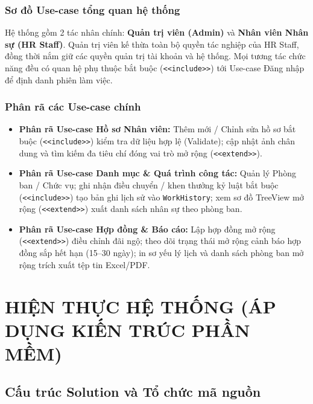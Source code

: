 \documentclass[12pt,a4paper]{report}
\begin{document}
\subsection{Sơ đồ Use-case tổng quan hệ thống}
Hệ thống gồm 2 tác nhân chính: \textbf{Quản trị viên (Admin)} và \textbf{Nhân viên Nhân sự (HR Staff)}. Quản trị viên kế thừa toàn bộ quyền tác nghiệp của HR Staff, đồng thời nắm giữ các quyền quản trị tài khoản và hệ thống. Mọi tương tác chức năng đều có quan hệ phụ thuộc bắt buộc (\texttt{<<include>>}) tới Use-case Đăng nhập để định danh phiên làm việc.

\subsection{Phân rã các Use-case chính}
\begin{itemize}[leftmargin=1.0cm]
    \item \textbf{Phân rã Use-case Hồ sơ Nhân viên:} Thêm mới / Chỉnh sửa hồ sơ bắt buộc (\texttt{<<include>>}) kiểm tra dữ liệu hợp lệ (Validate); cập nhật ảnh chân dung và tìm kiếm đa tiêu chí đóng vai trò mở rộng (\texttt{<<extend>>}).
    \item \textbf{Phân rã Use-case Danh mục \& Quá trình công tác:} Quản lý Phòng ban / Chức vụ; ghi nhận điều chuyển / khen thưởng kỷ luật bắt buộc (\texttt{<<include>>}) tạo bản ghi lịch sử vào \texttt{WorkHistory}; xem sơ đồ TreeView mở rộng (\texttt{<<extend>>}) xuất danh sách nhân sự theo phòng ban.
    \item \textbf{Phân rã Use-case Hợp đồng \& Báo cáo:} Lập hợp đồng mở rộng (\texttt{<<extend>>}) điều chỉnh đãi ngộ; theo dõi trạng thái mở rộng cảnh báo hợp đồng sắp hết hạn (15--30 ngày); in sơ yếu lý lịch và danh sách phòng ban mở rộng trích xuất tệp tin Excel/PDF.
\end{itemize}

\chapter{HIỆN THỰC HỆ THỐNG (ÁP DỤNG KIẾN TRÚC PHẦN MỀM)}

\section{Cấu trúc Solution và Tổ chức mã nguồn}
\end{document}
